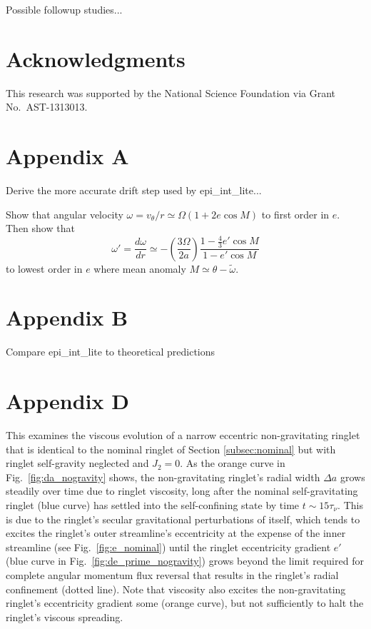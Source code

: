 \documentclass[preprint]{aastex62}
\begin{document}
Possible followup studies...

\acknowledgments
\section{Acknowledgments}
\label{sec:Acknowledgments}

This research was supported by the National Science Foundation via Grant No.\ AST-1313013.


\appendix

\section{Appendix A}
\label{sec:Appendix A}

Derive the more accurate drift step used by epi\_int\_lite...

Show that angular velocity $\omega=v_\theta/r\simeq\Omega(1+2e\cos M)$ to
first order in $e$. Then show that
\begin{equation}
    \label{eqn:domega-dr}
    \omega' = \frac{d\omega}{dr} \simeq -\left(\frac{3\Omega}{2a}\right)
        \frac{1-\frac{4}{3}e'\cos M}{1-e'\cos M}
\end{equation}
to lowest order in $e$ where mean anomaly $M\simeq\theta-\tilde{\omega}$.

\section{Appendix B}
\label{sec:Appendix B}

Compare epi\_int\_lite to theoretical predictions

\section{Appendix D}
\label{sec:Appendix D}

This examines the viscous evolution of a narrow eccentric non-gravitating
ringlet that is identical to the nominal ringlet of Section \ref{subsec:nominal} but
with ringlet self-gravity neglected and $J_2=0$.
As the orange curve in Fig.\ \ref{fig:da_nogravity} shows, the non-gravitating ringlet's
radial width $\Delta a$ grows steadily over time due to ringlet viscosity, 
long after the nominal self-gravitating ringlet (blue curve)
has settled into the self-confining state by time $t\sim15\tau_\nu$. This is due to the
ringlet's secular gravitational perturbations of itself,
which tends to excites the ringlet's outer streamline's eccentricity at the expense
of the inner streamline (see Fig.\ \ref{fig:e_nominal}) until the ringlet eccentricity gradient $e'$
(blue curve in Fig.\ \ref{fig:de_prime_nogravity}) grows beyond the
limit required for complete angular momentum flux reversal 
that results in the ringlet's radial confinement (dotted line). 
Note that viscosity also excites the non-gravitating
ringlet's eccentricity gradient some (orange curve), but not sufficiently to halt the ringlet's 
viscous spreading.
\end{document}
